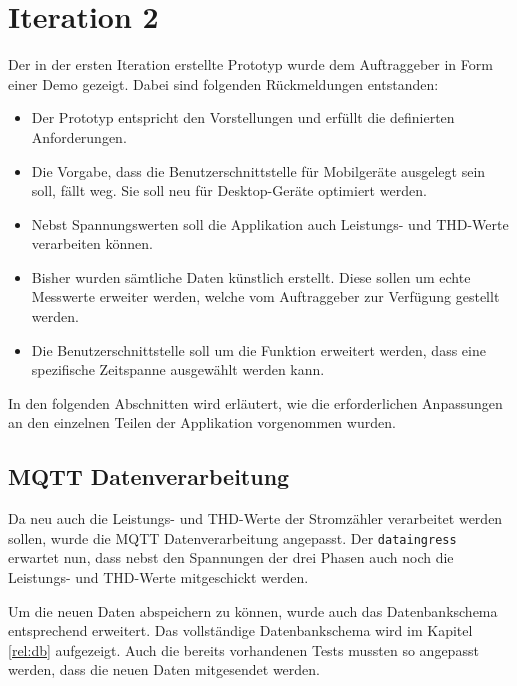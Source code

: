 \section{Iteration 2}
\label{i2}
Der in der ersten Iteration erstellte Prototyp wurde dem Auftraggeber in Form einer Demo gezeigt.
Dabei sind folgenden Rückmeldungen entstanden:

\begin{itemize}
    \item Der Prototyp entspricht den Vorstellungen und erfüllt die definierten Anforderungen.
    \item Die Vorgabe, dass die Benutzerschnittstelle für Mobilgeräte ausgelegt sein soll, fällt weg.
          Sie soll neu für Desktop-Geräte optimiert werden.
    \item Nebst Spannungswerten soll die Applikation auch Leistungs- und \ac{THD}-Werte verarbeiten können.
    \item Bisher wurden sämtliche Daten künstlich erstellt.
          Diese sollen um echte Messwerte erweiter werden, welche vom Auftraggeber zur Verfügung gestellt werden.
    \item Die Benutzerschnittstelle soll um die Funktion erweitert werden,
          dass eine spezifische Zeitspanne ausgewählt werden kann.
\end{itemize}
In den folgenden Abschnitten wird erläutert,
wie die erforderlichen Anpassungen an den einzelnen Teilen der Applikation vorgenommen wurden.

\subsection{\ac{MQTT} Datenverarbeitung}
\label{i2:mqtt}
Da neu auch die Leistungs- und \ac{THD}-Werte der Stromzähler verarbeitet werden sollen, wurde
die \ac{MQTT} Datenverarbeitung angepasst. Der \texttt{dataingress} erwartet nun, dass nebst
den Spannungen der drei Phasen auch noch die Leistungs- und \ac{THD}-Werte mitgeschickt werden.

Um die neuen Daten abspeichern zu können, wurde auch das Datenbankschema entsprechend erweitert.
Das vollständige Datenbankschema wird im Kapitel \ref{rel:db} aufgezeigt.
Auch die bereits vorhandenen Tests mussten so angepasst werden, dass die neuen Daten
mitgesendet werden.

